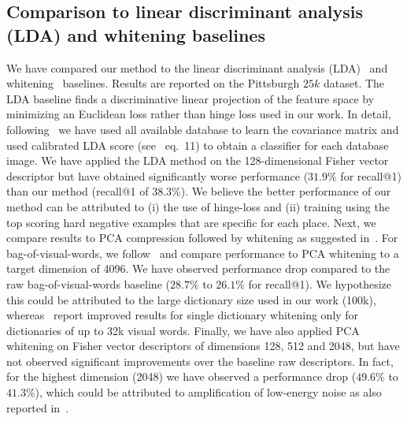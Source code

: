     \subsection{\textcolor{petr}{Comparison to linear discriminant analysis (LDA) and whitening baselines}}
\label{sec:LDA}
    \textcolor{petr}{
      We have compared our method to the linear discriminant analysis (LDA)~\cite{Aubry13,Hariharan12,Gharbi12} and whitening~\cite{JegouChum12} baselines. Results are reported on the Pittsburgh $25k$ dataset. The LDA baseline finds a discriminative linear projection of the feature space by minimizing an Euclidean loss rather than hinge loss used in our work. In detail, following~\cite{Aubry13} we have used all available database to learn the covariance matrix and used calibrated LDA score (see~\cite{Aubry13} eq.~11) to obtain a classifier for each database image.  
  We have applied the LDA method on the 128-dimensional Fisher vector descriptor but have obtained significantly worse performance ($31.9\%$ for recall@1) than our method (recall@1 of 38.3\%).
  We believe the better performance of our method can be attributed to (i) the use of hinge-loss and (ii) training using the top scoring hard negative examples that are specific for each place.  
      Next, we compare results to PCA compression followed by whitening as suggested in~\cite{JegouChum12}. For bag-of-visual-words, we follow~\cite{JegouChum12} and compare performance to PCA whitening to a target dimension of 4096. We have observed performance drop compared to the raw bag-of-visual-words baseline ($28.7\%$ to $26.1\%$ for recall@1). We hypothesize this could be attributed to the large dictionary size used in our work (100k), whereas~\cite{JegouChum12} report improved results for single dictionary whitening only for dictionaries of up to 32k visual words.
      Finally,  we have also applied PCA whitening on Fisher vector descriptors of dimensions 128, 512 and 2048, but have not observed significant improvements over the baseline raw descriptors. In fact, for the highest dimension (2048) we have observed a performance drop ($49.6\%$ to $41.3\%$), which could be attributed to amplification of low-energy noise as also reported in~\cite{JegouChum12}. 
      }
